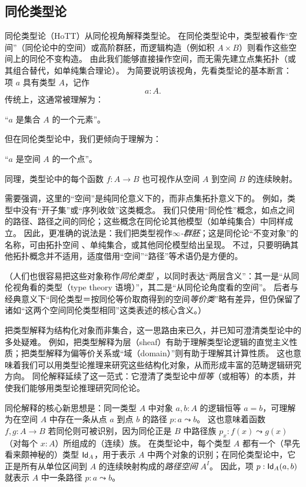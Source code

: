 \subsection*{同伦类型论}

同伦类型论（HoTT）从同伦视角解释类型论。
在同伦类型论中，类型被看作“空间”（同伦论中的空间）或高阶群胚，而逻辑构造（例如积 $A\times B$）则看作这些空间上的同伦不变构造。
由此我们能够直接操作空间，而无需先建立点集拓扑（或其组合替代，如单纯集合理论）。
为简要说明该视角，先看类型论的基本断言：
项 $a$ 具有类型 $A$，记作
\[ a:A. \]
传统上，这通常被理解为：
\begin{center}
“$a$ 是集合 $A$ 的一个元素”。
\end{center}
但在同伦类型论中，我们更倾向于理解为：
\begin{center}
“$a$ 是空间 $A$ 的一个点”。
\end{center}
%
同理，类型论中的每个函数 $f : A\to B$ 也可视作从空间 $A$ 到空间 $B$ 的连续映射。

需要强调，这里的“空间”是纯同伦意义下的，而非点集拓扑意义下的。
例如，类型中没有“开子集”或“序列收敛”这类概念。
我们只使用“同伦性”概念，如点之间的路径、路径之间的同伦；这些概念在同伦论其他模型（如单纯集合）中同样成立。
因此，更准确的说法是：我们把类型视作\emph{$\infty$-群胚}；这是同伦论“不变对象”的名称，可由拓扑空间
%
、单纯集合，或其他同伦模型给出呈现。
不过，只要明确其他拓扑概念并不适用，适度借用“空间”“路径”等术语仍是方便的。

（人们也很容易把这些对象称作\emph{同伦类型}
%
，以同时表达“两层含义”：其一是“从同伦视角看的类型（type theory 语境）”，其二是“从同伦论角度看的空间”。
后者与经典意义下“同伦类型＝按同伦等价取商得到的空间\emph{等价类}”略有差异，但仍保留了诸如“这两个空间同伦类型相同”这类表述的核心含义。）

把类型解释为结构化对象而非集合，这一思路由来已久，并已知可澄清类型论中的多处疑难。
例如，把类型解释为层（sheaf）有助于理解类型论逻辑的直觉主义性质；把类型解释为偏等价关系或“域（domain）”则有助于理解其计算性质。
这也意味着我们可以用类型论推理来研究这些结构化对象，从而形成丰富的范畴逻辑研究方向。
同伦解释延续了这一范式：它澄清了类型论中\emph{恒等}（或相等）的本质，并使我们能够用类型论推理研究同伦论。

同伦解释的核心新思想是：同一类型 $A$ 中对象 $a,b:A$ 的逻辑恒等 $a=b$，可理解为在空间 $A$ 中存在一条从点 $a$ 到点 $b$ 的路径 $p : a \leadsto b$。
这也意味着函数 $f, g: A\to B$ 若同伦则可被识别，因为同伦正是 $B$ 中路径族 $p_x: f(x) \leadsto g(x)$（对每个 $x:A$）所组成的（连续）族。
在类型论中，每个类型 $A$ 都有一个（早先看来颇神秘的）类型 $\idtypevar{A}$，用于表示 $A$ 中两个对象的识别；在同伦类型论中，它正是所有从单位区间到 $A$ 的连续映射构成的\emph{路径空间} $A^I$。
%
%
%
%
因此，项 $p : \idtype[A]{a}{b}$ 就表示 $A$ 中一条路径 $p : a \leadsto b$。

